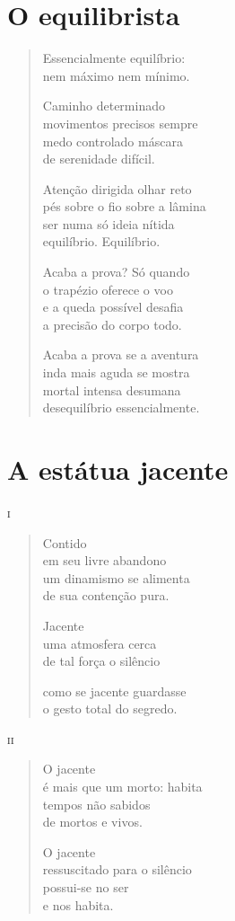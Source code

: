 \chapter{O equilibrista}

\begin{verse}
Essencialmente equilíbrio:\\
nem máximo nem mínimo.

Caminho determinado\\
movimentos precisos sempre\\
medo controlado máscara\\
de serenidade difícil.

Atenção dirigida olhar reto\\
pés sobre o fio sobre a lâmina\\
ser numa só ideia nítida\\
equilíbrio. Equilíbrio.

Acaba a prova? Só quando\\
o trapézio oferece o voo\\
e a queda possível desafia\\
a precisão do corpo todo.

Acaba a prova se a aventura\\
inda mais aguda se mostra\\
mortal intensa desumana\\
desequilíbrio essencialmente.
\end{verse}

\chapter{A estátua jacente}

\forceindent\textsc{i}

\begin{verse}
Contido\\
em seu livre abandono\\
um dinamismo se alimenta\\
de sua contenção pura.

Jacente\\
uma atmosfera cerca\\
de tal força o silêncio

como se jacente guardasse\\
o gesto total do segredo.
\end{verse}

\medskip
\textsc{ii}

\begin{verse}
O jacente\\
é mais que um morto: habita\\
tempos não sabidos\\
de mortos e vivos.

O jacente\\
ressuscitado para o silêncio\\
possui-se no ser\\
e nos habita.
\end{verse}

